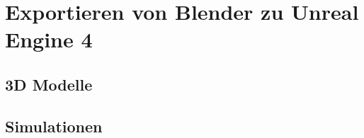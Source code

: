 \section{Exportieren von Blender zu Unreal Engine 4}
\label{sec:Exportieren_von_Blender_zu_Unreal_Engine_4}
\subsection{3D Modelle}
\subsection{Simulationen}
